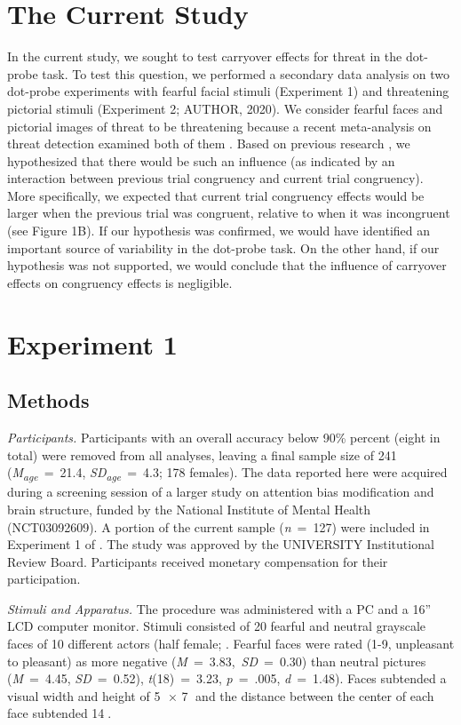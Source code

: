 \documentclass[issue,twocolumn,empirical, authordate,10pt]{jote-new-article}
\begin{document}
\section{The Current Study}

In the current study, we sought to test carryover effects for threat in the dot-probe task. To test this question, we performed a secondary data analysis on two dot-probe experiments with fearful facial stimuli (Experiment 1) and threatening pictorial stimuli (Experiment 2; AUTHOR, 2020). We consider fearful faces and pictorial images of threat to be threatening because a recent meta-analysis on threat detection examined both of them \parencite{Hedger2016}. Based on previous research \parencite{Gladwin2019, Gladwin2020}, we hypothesized that there would be such an influence (as indicated by an interaction between previous trial congruency and current trial congruency). More specifically, we expected that current trial congruency effects would be larger when the previous trial was congruent, relative to when it was incongruent (see Figure 1B). If our hypothesis was confirmed, we would have identified an important source of variability in the dot-probe task. On the other hand, if our hypothesis was not supported, we would conclude that the influence of carryover effects on congruency effects is negligible.


\section{Experiment 1}

\subsection{Methods}

\emph{Participants. }Participants with an overall accuracy below 90\% percent (eight in total) were removed from all analyses, leaving a final sample size of 241 (\emph{M}\textsubscript{\emph{age}}~=~21.4, \emph{SD}\textsubscript{\emph{age}}~=~4.3; 178 females). The data reported here were acquired during a screening session of a larger study on attention bias modification and brain structure, funded by the National Institute of Mental Health (NCT03092609). A portion of the current sample (\emph{n}~=~127) were included in Experiment 1 of \parencite{Carlson2020}. The study was approved by the UNIVERSITY Institutional Review Board. Participants received monetary compensation for their participation.

\emph{Stimuli and Apparatus. }The procedure was administered with a PC and a 16” LCD computer monitor. Stimuli consisted of 20 fearful and neutral grayscale faces of 10 different actors (half female; \parencite{Gur2002, Lundqvist1998}. Fearful faces were rated (1-9, unpleasant to pleasant) as more negative (\emph{M}~=~3.83,~\emph{SD}~=~0.30) than neutral pictures (\emph{M}~=~4.45, \emph{SD}~=~0.52), \emph{t}(18)~=~3.23, \emph{p}~=~.005, \emph{d}~=~1.48). Faces subtended a visual width and height of 5 × 7 and the distance between the center of each face subtended 14.
\end{document}
